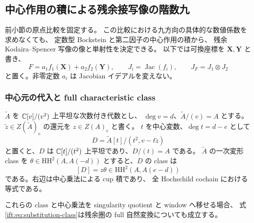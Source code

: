 \subsection{中心作用の積による残余接写像の階数九}
\label{ift:subsec:residual-rank}

前小節の原点比較を固定する。
この比較における九方向の具体的な数値係数を求めなくても、
定数型 Bockstein と第二因子の中心作用の積から、
残余 Kodaira--Spencer 写像の像と単射性を決定できる。
以下では可換座標を $\mathbf X,\mathbf Y$ と書き、
\[
 F=a_1f_1(\mathbf X)+a_2f_2(\mathbf Y),\qquad
 J_i=\operatorname{Jac}(f_i),\qquad
 J_F=J_1\otimes J_2
\]
と置く。非零定数 $a_i$ は Jacobian イデアルを変えない。

\subsubsection{中心元の代入と full characteristic class}

\begin{lemma}[平方零の中心代入]
\label{ift:lem:central-substitution}
$\widetilde A$ を $\mathbb C[v]/(v^2)$ 上平坦な次数付き代数とし、
$\deg v=d$、$\widetilde A/(v)=A$ とする。
$\widetilde z\in Z(\widetilde A)_e$ の還元を $z\in Z(A)_e$ と書く。
$t$ を中心変数、$\deg t=d-e$ として
\[
 D=\widetilde A[t]/(t^2,v-t\widetilde z)
\]
と置くと、$D$ は $\mathbb C[t]/(t^2)$ 上平坦であり、$D/(t)=A$ である。
$\widetilde A$ の一次変形 class を
$\theta\in\mathrm{HH}^2(A,A(-d))$ とすると、$D$ の class は
\begin{equation}\label{ift:eq:substitution-class}
       [D]=z\theta\in\mathrm{HH}^2(A,A(e-d))
\end{equation}
である。右辺は中心乗法による cup 積であり、
全 Hochschild cochain における等式である。

これらの class と中心乗法を singularity quotient と window へ移せる場合、
式\eqref{ift:eq:substitution-class}は残余圏の full 自然変換についても成立する。
\end{lemma}

